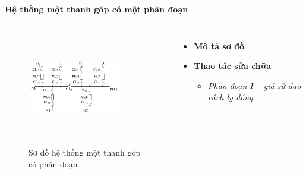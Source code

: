 \documentclass{beamer}
\begin{document}
\begin{frame}{\textbf{Hệ thống một thanh góp có một phân đoạn}}
\begin{columns}
\begin{figure}[h]
\includegraphics[width=4cm, height=5cm]{mtgcpd}
\caption{Sơ đồ hệ thống một thanh góp có phân đoạn}
\end{figure}

\begin{itemize}
\item \textbf{Mô tả sơ đồ}
\item  \textbf{Thao tác sửa chữa}
\begin{itemize}
\item<1-> \emph{Phân đoạn $I$ -- giả sử dao cách ly đóng}: 
\end{itemize}
\end{itemize}
\end{columns}
\end{frame}
\end{document}
